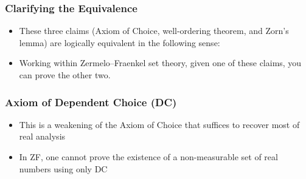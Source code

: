 \begin{frame}
\frametitle{Clarifying the Equivalence}

\begin{itemize}[<+->]

\item These three claims (Axiom of Choice, well-ordering theorem, and Zorn's lemma) are logically equivalent in the following sense:

\item Working within Zermelo--Fraenkel set theory, given one of these claims, you can prove the other two.

\end{itemize}
\end{frame}

\begin{frame}
\frametitle{Axiom of Dependent Choice (DC)}

\begin{itemize}[<+->]

\item This is a weakening of the Axiom of Choice that suffices to recover most of real analysis


\item In ZF, one cannot prove the existence of a non-measurable set of real numbers using only DC


\end{itemize}
\end{frame}


\fi %








